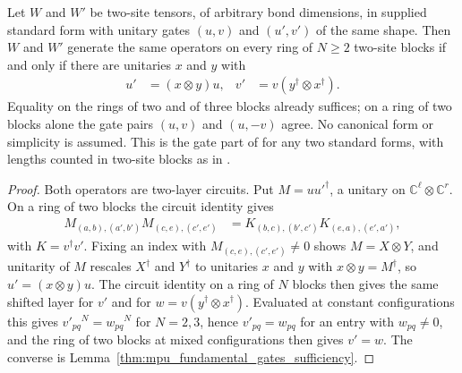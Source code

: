 \begin{lemma}
    \label{thm:mpu_fundamental_gates_supplied}
    \leanok
    Let $W$ and $W'$ be two-site tensors, of arbitrary bond dimensions, in
    supplied standard form with unitary gates $(u,v)$ and $(u',v')$ of the
    same shape. Then $W$ and $W'$ generate the same operators on every ring of
    $N\geq2$ two-site blocks if and only if there are unitaries $x$ and $y$
    with
    \begin{align}
        u' & =(x\otimes y)u, & v' & =v(y^\dagger\otimes x^\dagger).
    \end{align}
    Equality on the rings of two and of three blocks already suffices; on a
    ring of two blocks alone the gate pairs $(u,v)$ and $(u,-v)$ agree. No
    canonical form or simplicity is assumed. This is the gate part of
    \cite[Theorem~\textup{FundamentalMPU}]{Cirac2017MPU} for any two
    standard forms, with lengths counted in two-site blocks as in
    \cite{gap:mpu_standard_form_parity_gap}.
\end{lemma}
\begin{proof}\leanok
    Both operators are two-layer circuits. Put $M=uu'^\dagger$, a unitary on
    $\mathbb C^\ell\otimes\mathbb C^r$. On a ring of two blocks the circuit
    identity gives
    \begin{align}
        M_{(a,b),(a',b')}M_{(c,e),(c',e')}
         & =K_{(b,c),(b',c')}K_{(e,a),(e',a')},
    \end{align}
    with $K=v^\dagger v'$. Fixing an index with $M_{(c,e),(c',e')}\neq0$
    shows $M=X\otimes Y$, and unitarity of $M$ rescales $X^\dagger$ and
    $Y^\dagger$ to unitaries $x$ and $y$ with $x\otimes y=M^\dagger$, so
    $u'=(x\otimes y)u$. The circuit identity on a ring of $N$ blocks then
    gives the same shifted layer for $v'$ and for $w=v(y^\dagger\otimes
        x^\dagger)$. Evaluated at constant configurations this gives
    $v'_{pq}{}^N=w_{pq}{}^N$ for $N=2,3$, hence $v'_{pq}=w_{pq}$ for an
    entry with $w_{pq}\neq0$, and the ring of two blocks at mixed
    configurations then gives $v'=w$. The converse is
    Lemma~\ref{thm:mpu_fundamental_gates_sufficiency}.
\end{proof}

